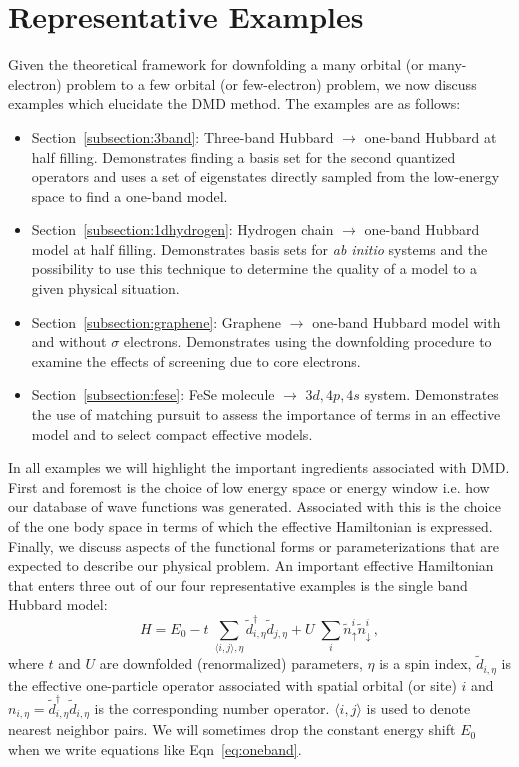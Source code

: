 \section{Representative Examples}
Given the theoretical framework for downfolding a many orbital (or many-electron) problem to a 
few orbital (or few-electron) problem, we now discuss examples which elucidate the DMD method. 
The examples are as follows:
\begin{itemize}
\item Section~\ref{subsection:3band}: Three-band Hubbard $\rightarrow$ one-band Hubbard at half filling. Demonstrates finding a basis set for the second quantized operators and uses a set of eigenstates directly sampled from the low-energy space to find a one-band model.
\item Section~\ref{subsection:1dhydrogen}: Hydrogen chain $\rightarrow$ one-band Hubbard model at half filling. Demonstrates basis sets for {\it ab initio} systems and the possibility to use this technique to determine the quality of a model to a given physical situation.
\item Section~\ref{subsection:graphene}: Graphene $\rightarrow$ one-band Hubbard model with and without $\sigma$ electrons. Demonstrates using the downfolding procedure to examine the effects of screening due to core electrons. 
\item Section~\ref{subsection:fese}: FeSe molecule $\rightarrow$ $3d,4p,4s$ system. Demonstrates the use of matching pursuit to assess the importance of terms in an effective model and to select compact effective models.
\end{itemize}

In all examples we will highlight the important ingredients associated with DMD. 
First and foremost is the choice of low energy space or energy window i.e. how our database of wave functions was generated. 
Associated with this is the choice of the one body space in terms of which the effective Hamiltonian is expressed. 
Finally, we discuss aspects of the functional forms or parameterizations that are expected to describe our physical problem. 
An important effective Hamiltonian that enters three out of our four representative examples is the single band Hubbard model:
\begin{equation}
	H = E_0 -t \;\sum_{\langle i,j \rangle, \eta} \tilde{d}_{i,\eta}^{\dagger} \tilde{d}_{j,\eta} + U \;\sum_{i} \tilde{n}^{i}_{\uparrow} \tilde{n}^{i}_{\downarrow}\,,
\label{eq:oneband}
\end{equation}
where $t$ and $U$ are downfolded (renormalized) parameters, $\eta$ is a spin index, 
$\tilde{d}_{i,\eta}$ is the effective one-particle operator associated with spatial orbital (or site) $i$ 
and $n_{i,\eta}=\tilde{d}_{i,\eta}^{\dagger} \tilde{d}_{i,\eta}$ is the corresponding number operator.
$\langle i,j \rangle$ is used to denote nearest neighbor pairs.
We will sometimes drop the constant energy shift $E_0$ when we write equations like Eqn~\ref{eq:oneband}.

